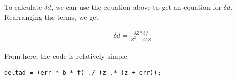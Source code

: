 \documentclass[11pt]{article}
\begin{document}
\begin{enumerate}
\begin{enumerate}
To calculate $\delta d$, we can use the equation above to get an equation for
$\delta d$. Rearranging the terms, we get

\begin{align*}
\delta d = \frac{\delta Z * bf}{Z^2 + Z \delta Z}
\end{align*}

From here, the code is relatively simple:
\begin{verbatim}
deltad = (err * b * f) ./ (z .* (z + err));
\end{verbatim}

\end{enumerate}

\end{enumerate}
\end{document}
